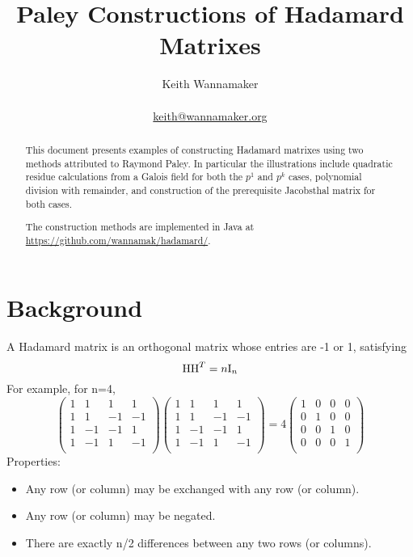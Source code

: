 \documentclass{article}
\title{Paley Constructions of Hadamard Matrixes}
\author{Keith Wannamaker \\
\\
{\href{mailto:keith@wannamaker.org}{keith@wannamaker.org}}}
\begin{document}
\maketitle

\begin{abstract}
This document presents examples of constructing Hadamard matrixes
using two methods attributed to Raymond Paley.  In particular
the illustrations include quadratic residue calculations from a
Galois field for both the $p^1$ and $p^k$ cases, polynomial
division with remainder, and construction of the prerequisite
Jacobsthal matrix for both cases.

The construction methods are implemented in Java at
\url{https://github.com/wannamak/hadamard/}.
\end{abstract}

\section{Background}

A Hadamard matrix is an orthogonal matrix whose entries are -1 or 1, satisfying
\begin{equation}
\textnormal{H}\textnormal{H}^{T} = {n}\textnormal{I}_{n}
\end{equation}
For example, for n=4,
\begin{equation}
\begin{pmatrix}
1 & 1 & 1 & 1 \\
1 & 1 & -1 & -1 \\
1 & -1 & -1 & 1 \\
1 & -1 & 1 & -1 \\
\end{pmatrix}
\begin{pmatrix}
1 & 1 & 1 & 1 \\
1 & 1 & -1 & -1 \\
1 & -1 & -1 & 1 \\
1 & -1 & 1 & -1 \\
\end{pmatrix}
= 4
\begin{pmatrix}
1 & 0 & 0 & 0 \\
0 & 1 & 0 & 0 \\
0 & 0 & 1 & 0 \\
0 & 0 & 0 & 1 \\
\end{pmatrix}
\end{equation}
Properties:
\begin{itemize}
\item Any row (or column) may be exchanged with any row (or column).
\item Any row (or column) may be negated.
\item There are exactly n/2 differences between any two rows (or columns).
\end{itemize}
\end{document}
